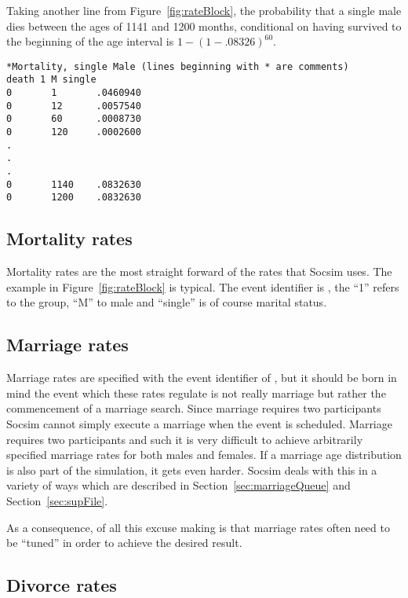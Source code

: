 Taking another line from Figure~\ref{fig:rateBlock}, the probability that a single male dies
between the ages of 1141 and 1200 months, conditional on having
survived to the beginning of the age interval is $1-(1-.08326)^{60}$.
\begin{figure*}[h]
  \centering
\label{fig:rateBlock}
\caption{Example of a block of mortality rates}
\begin{verbatim}
*Mortality, single Male (lines beginning with * are comments)
death 1 M single
0       1       .0460940
0       12      .0057540
0       60      .0008730
0       120     .0002600
.
.
.
0       1140    .0832630
0       1200    .0832630

\end{verbatim}
\end{figure*}


\subsection{Mortality rates}
\label{sec:mortRates}

Mortality rates are the most straight forward of the rates that Socsim
uses. The example in Figure~\ref{fig:rateBlock} is typical. The event
identifier is , the ``1'' refers to the group, ``M'' to
male and ``single'' is of course marital status.

\subsection{Marriage rates}
\label{sec:marriageRates}

Marriage rates are specified with the event identifier of
, but it should be born in mind the event which these
rates regulate is not really marriage but rather the commencement of a
marriage search.  Since marriage requires two participants Socsim
cannot simply execute a marriage when the event is scheduled.  Marriage
requires two participants and such it is very difficult to achieve arbitrarily specified marriage rates for both males and females. If a marriage age distribution is also part of the simulation, it gets even harder.  Socsim deals with this in a variety of ways which are described in Section~\ref{sec:marriageQueue} and
Section~\ref{sec:supFile}.

As a consequence, of all this excuse making is that marriage rates
often need to be ``tuned'' in order to achieve the desired result.

\subsection{Divorce rates}

